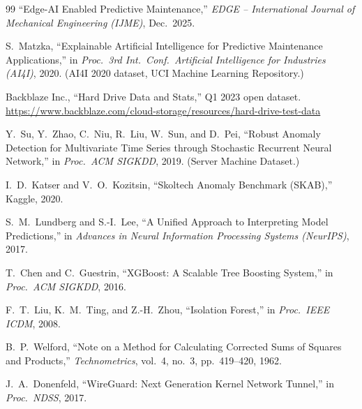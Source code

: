 \documentclass[12pt,a4paper]{report}
\begin{document}
\begin{thebibliography}{99}
 ``Edge-AI Enabled Predictive Maintenance,'' \textit{EDGE -- International Journal of Mechanical Engineering (IJME)}, Dec.\ 2025.

 S.~Matzka, ``Explainable Artificial Intelligence for Predictive Maintenance Applications,'' in \textit{Proc.\ 3rd Int.\ Conf.\ Artificial Intelligence for Industries (AI4I)}, 2020. (AI4I 2020 dataset, UCI Machine Learning Repository.)

 Backblaze Inc., ``Hard Drive Data and Stats,'' Q1 2023 open dataset. \url{https://www.backblaze.com/cloud-storage/resources/hard-drive-test-data}

 Y.~Su, Y.~Zhao, C.~Niu, R.~Liu, W.~Sun, and D.~Pei, ``Robust Anomaly Detection for Multivariate Time Series through Stochastic Recurrent Neural Network,'' in \textit{Proc.\ ACM SIGKDD}, 2019. (Server Machine Dataset.)

 I.~D.~Katser and V.~O.~Kozitsin, ``Skoltech Anomaly Benchmark (SKAB),'' Kaggle, 2020.

 S.~M.~Lundberg and S.-I.~Lee, ``A Unified Approach to Interpreting Model Predictions,'' in \textit{Advances in Neural Information Processing Systems (NeurIPS)}, 2017.

 T.~Chen and C.~Guestrin, ``XGBoost: A Scalable Tree Boosting System,'' in \textit{Proc.\ ACM SIGKDD}, 2016.

 F.~T.~Liu, K.~M.~Ting, and Z.-H.~Zhou, ``Isolation Forest,'' in \textit{Proc.\ IEEE ICDM}, 2008.

 B.~P.~Welford, ``Note on a Method for Calculating Corrected Sums of Squares and Products,'' \textit{Technometrics}, vol.~4, no.~3, pp.~419--420, 1962.

 J.~A.~Donenfeld, ``WireGuard: Next Generation Kernel Network Tunnel,'' in \textit{Proc.\ NDSS}, 2017.

\end{thebibliography}
\end{document}
